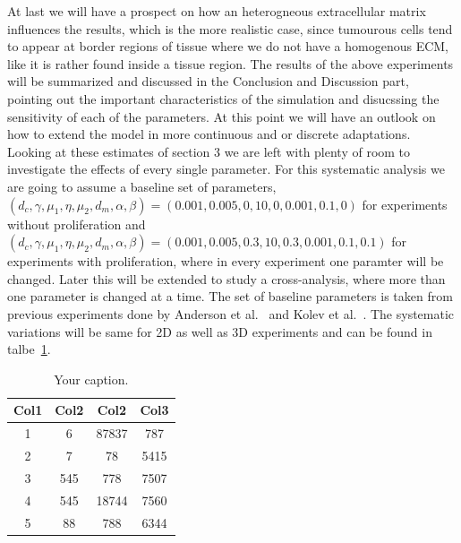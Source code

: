 At last we will have a prospect on how an heterogneous extracellular matrix influences the results, which is the more realistic case, since tumourous cells tend to appear at border regions of tissue where we do not have a homogenous ECM, like it is rather found inside a tissue region. \newline
The results of the above experiments will be summarized and discussed in the Conclusion and Discussion part, pointing out the important characteristics of the simulation and disucssing the sensitivity of each of the parameters. At this point we will have an outlook on how to extend the model in more continuous and or discrete adaptations.
Looking at these estimates of section 3 we are left with plenty of room to investigate the effects of every single parameter. For this systematic analysis we are going to assume a baseline set of parameters, $(d_c, \gamma, \mu_1, \eta, \mu_2, d_m, \alpha, \beta) = (0.001, 0.005, 0, 10, 0, 0.001,0.1, 0)$ for experiments without proliferation and \newline
$(d_c, \gamma, \mu_1, \eta, \mu_2, d_m, \alpha, \beta) = (0.001, 0.005, 0.3, 10, 0.3, 0.001,0.1, 0.1)$ for experiments with proliferation, where in every experiment one paramter will be changed. Later this will be extended to study a cross-analysis, where more than one parameter is changed at a time. The set of baseline parameters is taken from previous experiments done by Anderson et al.~\cite{anderson_mathematical_2000} and Kolev et al.~\cite{Kolev2010}. The systematic variations will be same for 2D as well as 3D experiments and can be found in talbe~\ref{tab:systematic_analysis}.

\begin{table}[!h]
    \begin{center}
        \label{tab:systematic_analysis}
        \begin{tabular}{||c c c c||} 
            \hline
            Col1 & Col2 & Col2 & Col3 \\ [0.5ex] 
            \hline\hline
            1 & 6 & 87837 & 787 \\ 
            \hline
            2 & 7 & 78 & 5415 \\
            \hline
            3 & 545 & 778 & 7507 \\
            \hline
            4 & 545 & 18744 & 7560 \\
            \hline
            5 & 88 & 788 & 6344 \\ [1ex] 
            \hline
        \end{tabular}
        \caption{Your caption.}
    \end{center}
\end{table}

